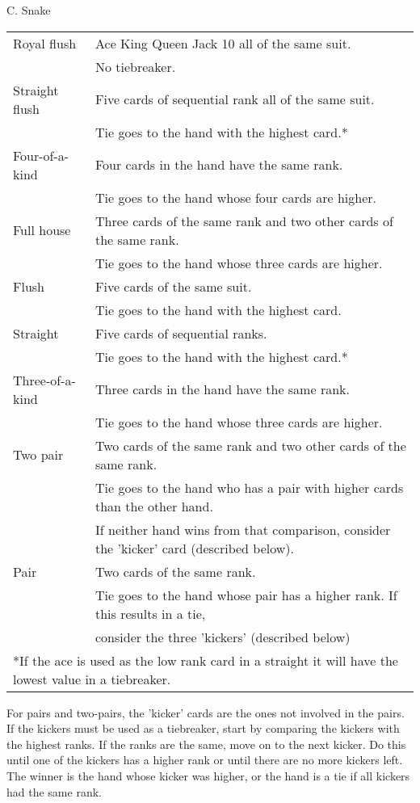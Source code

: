 \begin{problem}{C. Snake}
\begin{tabular}{|l|l|} 
\hline
 Royal flush & Ace King Queen Jack 10 all of the same suit. \\
  & No tiebreaker. \\ 
 \hline
 Straight flush & Five cards of sequential rank all of the same suit. \\
  & Tie goes to the hand with the highest card.* \\ 
 \hline
 Four-of-a-kind & Four cards in the hand have the same rank. \\
  & Tie goes to the hand whose four cards are higher. \\ 
 \hline
 Full house & Three cards of the same rank and two other cards of the same rank. \\
  & Tie goes to the hand whose three cards are higher. \\ 
 \hline
 Flush & Five cards of the same suit. \\
  & Tie goes to the hand with the highest card. \\ 
 \hline
 Straight & Five cards of sequential ranks. \\ 
  & Tie goes to the hand with the highest card.* \\ 
 \hline
 Three-of-a-kind & Three cards in the hand have the same rank. \\ 
  & Tie goes to the hand whose three cards are higher. \\
 \hline
 Two pair & Two cards of the same rank and two other cards of the same rank. \\ 
  & Tie goes to the hand who has a pair with higher cards than the other hand. \\
  & If neither hand wins from that comparison, consider the 'kicker' card (described below). \\
 \hline
 Pair & Two cards of the same rank. \\ 
  & Tie goes to the hand whose pair has a higher rank. If this results in a tie, \\
  & consider the three 'kickers' (described below) \\
 \hline
 
 \multicolumn{2}{l}{*If the ace is used as the low rank card in a straight it will have the lowest value in a tiebreaker.} \\
\end{tabular}

 For pairs and two-pairs, the 'kicker' cards are the ones not involved in the pairs. If the kickers must be used as a tiebreaker, start by comparing the kickers with the highest ranks. If the ranks are the same, move on to the next kicker. Do this until one of the kickers has a higher rank or until there are no more kickers left. The winner is the hand whose kicker was higher, or the hand is a tie if all kickers had the same rank.
 

\end{problem}

